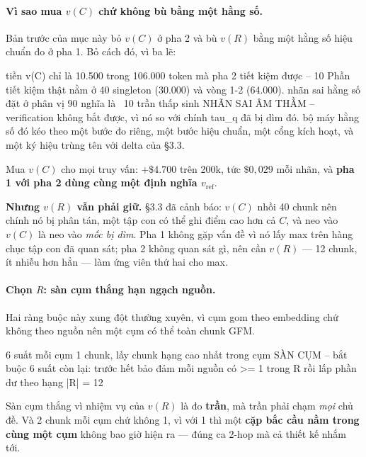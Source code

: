 \documentclass[11pt,a4paper]{article}
\begin{document}
\paragraph{Vì sao mua $v(C)$ chứ không bù bằng một hằng số.} Bản trước của mục này bỏ $v(C)$ ở
pha 2 và bù $v(R)$ bằng một hằng số hiệu chuẩn đo ở pha 1. Bỏ cách đó, vì ba lẽ:

\begin{dia}
tiền      v(C) chỉ là 10.500 trong 106.000 token mà pha 2 tiết kiệm được -- 10%
          Phần tiết kiệm thật nằm ở 40 singleton (30.000) và vòng 1-2 (64.000).
nhãn sai  hằng số đặt ở phân vị 90 nghĩa là ~10%
          trần thấp sinh NHÃN SAI ÂM THẦM -- verification không bắt được, vì nó
          so với chính tau_q đã bị dìm đó.
bộ máy    hằng số đó kéo theo một bước đo riêng, một bước hiệu chuẩn, một cổng
          kích hoạt, và một ký hiệu trùng tên với delta của §3.3.
\end{dia}

Mua $v(C)$ cho mọi truy vấn: $+\$4.700$ trên 200k, tức $\$0{,}029$ mỗi nhãn, và \textbf{pha 1
với pha 2 dùng cùng một định nghĩa $v_{\text{ref}}$}.

\textbf{Nhưng $v(R)$ vẫn phải giữ.} \S3.3 đã cảnh báo: $v(C)$ nhồi 40 chunk nên chính nó bị
phân tán, một tập con có thể ghi điểm cao hơn cả $C$, và neo vào $v(C)$ là neo vào \emph{mốc
bị dìm}. Pha 1 không gặp vấn đề vì nó lấy max trên hàng chục tập con đã quan sát; pha 2 không
quan sát gì, nên cần $v(R)$ --- 12 chunk, ít nhiễu hơn hẳn --- làm ứng viên thứ hai cho max.

\paragraph{Chọn $R$: sàn cụm thắng hạn ngạch nguồn.} Hai ràng buộc này xung đột thường xuyên,
vì cụm gom theo embedding chứ không theo nguồn nên một cụm có thể toàn chunk GFM.

\begin{dia}
6 suất   mỗi cụm 1 chunk, lấy chunk hạng cao nhất trong cụm     SÀN CỤM -- bắt buộc
6 suất   còn lại: trước hết bảo đảm mỗi nguồn có >= 1 trong R
                  rồi lấp phần dư theo hạng
                                                                |R| = 12
\end{dia}

Sàn cụm thắng vì nhiệm vụ của $v(R)$ là đo \textbf{trần}, mà trần phải chạm \emph{mọi} chủ đề.
Và 2 chunk mỗi cụm chứ không 1, vì với 1 thì một \textbf{cặp bắc cầu nằm trong cùng một cụm}
không bao giờ hiện ra --- đúng ca 2-hop mà cả thiết kế nhắm tới.
\end{document}
